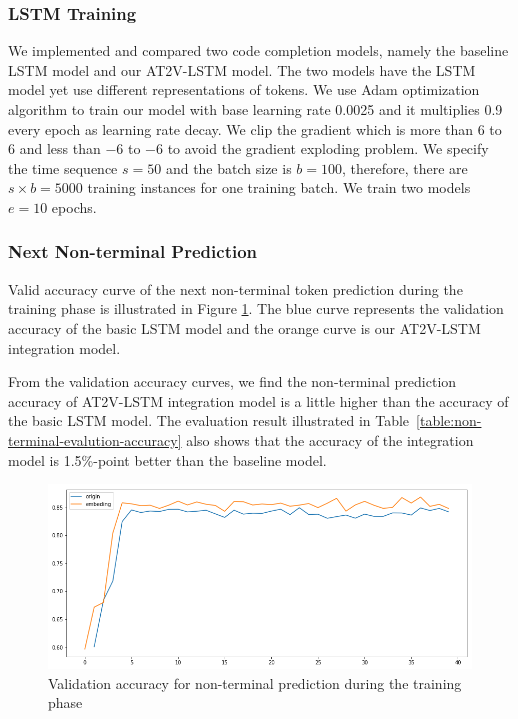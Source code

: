 \documentclass[E]{compsoft}
\begin{document}
\subsubsection{LSTM Training}
We implemented and compared two code completion models, namely the baseline LSTM model and our AT2V-LSTM model.  The two models have the LSTM model yet use different representations of tokens.
We use Adam optimization algorithm to train our model with base learning rate 0.0025 and it multiplies 0.9 every epoch as learning rate decay. 
We clip the gradient which is more than 6 to 6 and less than $-6$ to $-6$ to avoid the gradient exploding problem.
We specify the time sequence $s=50$ and the batch size is $b=100$, therefore, there are $s \times b = 5000$ training instances for one training batch. 
We train two models $e=10$ epochs.

\subsubsection{Next Non-terminal Prediction} 
Valid accuracy curve of the next non-terminal token prediction during the training phase is illustrated in Figure \ref{fig:valid_accuracy_for_non_terminal}. 
The blue curve represents the validation accuracy of the basic LSTM model and the orange curve is our AT2V-LSTM integration model. 

From the validation accuracy curves, we find the non-terminal prediction accuracy of AT2V-LSTM integration model is a little higher than the accuracy of the basic LSTM model. The evaluation result illustrated in Table~\ref{table:non-terminal-evalution-accuracy} also shows that the accuracy of the integration model is 1.5\%-point better than the baseline model. 

\begin{figure}[!ht]
\centering
\includegraphics[scale=0.25]{pictures/nt_valid_accuracy.png}
\caption{Validation accuracy for non-terminal prediction during the training phase}
\label{fig:valid_accuracy_for_non_terminal}
\end{figure}
\end{document}

